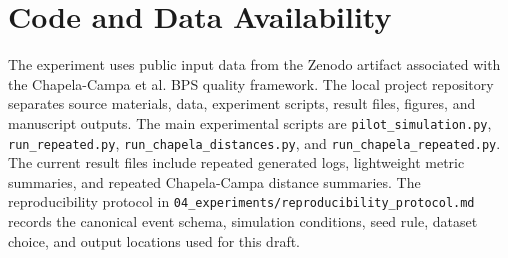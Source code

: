 \section{Code and Data Availability}\label{code-and-data-availability}

The experiment uses public input data from the Zenodo artifact associated
with the Chapela-Campa et al. BPS quality framework. The local project
repository separates source materials, data, experiment scripts, result
files, figures, and manuscript outputs. The main experimental scripts are
\texttt{pilot\_simulation.py}, \texttt{run\_repeated.py},
\texttt{run\_chapela\_distances.py}, and
\texttt{run\_chapela\_repeated.py}. The current result files include
repeated generated logs, lightweight metric summaries, and repeated
Chapela-Campa distance summaries. The reproducibility protocol in
\texttt{04\_experiments/reproducibility\_protocol.md} records the
canonical event schema, simulation conditions, seed rule, dataset choice,
and output locations used for this draft.

